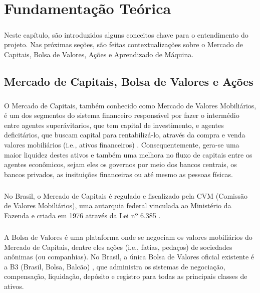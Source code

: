 \chapter{Fundamentação Teórica}
\label{cap2}

\paragraph{} Neste capítulo, são introduzidos alguns conceitos chave para o entendimento do projeto. Nas próximas seções, são feitas contextualizações sobre o Mercado de Capitais, Bolsa de Valores, Ações e Aprendizado de Máquina.

\section{Mercado de Capitais, Bolsa de Valores e Ações}

\paragraph{} O Mercado de Capitais, também conhecido como Mercado de Valores Mobiliários, é um dos segmentos do sistema financeiro responsável por fazer o intermédio entre agentes superávitarios, que tem capital de investimento, e agentes deficitários, que buscam capital para rentabilizá-lo, através da compra e venda valores mobiliários (i.e., ativos financeiros) \cite{mercado_de_capitais}. Consequentemente, gera-se uma maior liquidez destes ativos e também uma melhora no fluxo de capitais entre os agentes econômicos, sejam eles os governos por meio dos bancos centrais, os bancos privados, as insituições financeiras ou até mesmo as pessoas físicas.

\paragraph{} No Brasil, o Mercado de Capitais é regulado e fiscalizado pela CVM (Comissão de Valores Mobiliários), uma autarquia federal vinculada ao Ministério da Fazenda e criada em 1976 através da Lei nº 6.385 \cite{lei_6385}.

\paragraph{} A Bolsa de Valores é uma plataforma onde se negociam os valores mobiliários do Mercado de Capitais, dentre eles ações (i.e., fatias, pedaços) de sociedades anônimas (ou companhias). No Brasil, a única Bolsa de Valores oficial existente é a B3 (Brasil, Bolsa, Balcão) \cite{b3}, que administra os sistemas de negociação, compensação, liquidação, depósito e registro para todas as principais classes de ativos.

